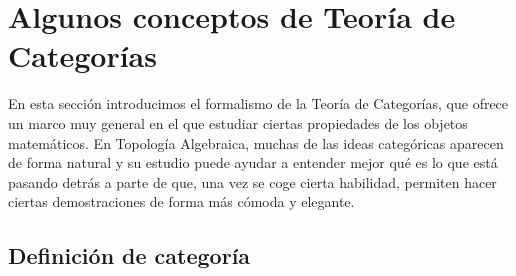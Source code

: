 \documentclass[12pt,a4paper]{book}
\theoremstyle{definition} \newtheorem{defn}[thm]{Definición}
\theoremstyle{definition} \newtheorem{ejemplo}[thm]{Ejemplo}
\theoremstyle{definition} \newtheorem{ejercicio}[thm]{Ejercicio}
\theoremstyle{remark} \newtheorem*{obs}{Observación}
\begin{document}
\section{Algunos conceptos de Teoría de Categorías}
En esta sección introducimos el formalismo de la Teoría de Categorías, que ofrece un marco muy general en el que estudiar ciertas propiedades de los objetos matemáticos. En Topología Algebraica, muchas de las ideas categóricas aparecen de forma natural y su estudio puede ayudar a entender mejor qué es lo que está pasando detrás a parte de que, una vez se coge cierta habilidad, permiten hacer ciertas demostraciones de forma más cómoda y elegante.

\subsection{Definición de categoría}
\end{document}
